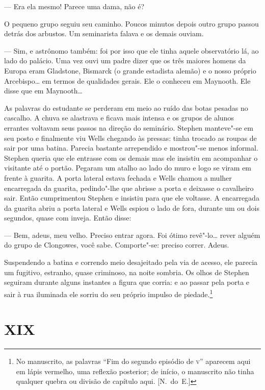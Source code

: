 --- Era ela mesmo!  Parece uma dama, não é?

O pequeno grupo seguiu seu caminho.  Poucos minutos depois outro
grupo passou detrás dos arbustos.  Um seminarista falava e os demais
ouviam.

--- Sim, e astrônomo também: foi por isso que ele tinha
aquele observatório lá, ao lado do palácio.  Uma vez ouvi
um padre dizer que os três maiores homens da Europa eram Gladstone,
Bismarck (o grande estadista alemão) e o nosso próprio Arcebispo\ldots{} em
termos de qualidades gerais.  Ele o conheceu em Maynooth.  Ele disse
que em Maynooth\ldots{}

As palavras do estudante se perderam em meio ao ruído das botas
pesadas no cascalho.  A chuva se alastrava e ficava mais intensa e os
grupos de alunos errantes voltavam seus passos na direção do seminário.
Stephen manteve"-se em seu posto e finalmente viu Wells chegando às
pressas: tinha trocado as roupas de sair por uma batina.  Parecia
bastante arrependido e mostrou"-se menos informal.  Stephen queria que
ele entrasse com os demais mas ele insistiu em acompanhar o visitante
até o portão.  Pegaram um atalho ao lado do muro e logo se viram em
frente à guarita. A porta lateral estava fechada e Wells
chamou a mulher encarregada da guarita, pedindo"-lhe que abrisse a porta
e deixasse o cavalheiro sair.  Então cumprimentou Stephen e insistiu
para que ele voltasse.  A encarregada da guarita abriu a porta lateral
e Wells espiou o lado de fora, durante um ou dois segundos, quase com
inveja.  Então disse:

--- Bem, adeus, meu velho.  Preciso entrar agora.  Foi ótimo
revê"-lo\ldots{} rever alguém do grupo de Clongowes, você sabe.  Comporte"-se:
preciso correr.  Adeus.

Suspendendo a batina e correndo meio desajeitado pela via de acesso,
ele \label{parecia"-um} parecia um fugitivo, estranho, quase criminoso, na noite
sombria.  Os olhos de Stephen seguiram durante alguns instantes a
figura que corria: e ao passar pela porta e sair à rua iluminada ele
sorriu do seu próprio impulso de piedade.\footnote{ No manuscrito, as
palavras “Fim do segundo episódio de \textsc{v}” aparecem aqui em lápis
vermelho, uma reflexão posterior; de início, o manuscrito não tinha
qualquer quebra ou divisão de capítulo aqui. [N.~do~E.]}


\section{XIX}

